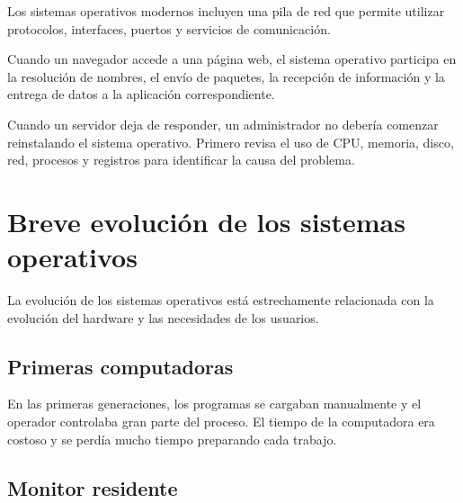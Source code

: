 \documentclass[
  spanish,
  letterpaper,
]{scrbook}
\begin{document}
Los sistemas operativos modernos incluyen una pila de red que permite
utilizar protocolos, interfaces, puertos y servicios de comunicación.

Cuando un navegador accede a una página web, el sistema operativo
participa en la resolución de nombres, el envío de paquetes, la
recepción de información y la entrega de datos a la aplicación
correspondiente.

\begin{tcolorbox}[enhanced jigsaw, arc=.35mm, bottomrule=.15mm, bottomtitle=1mm, breakable, colback=white, colbacktitle=quarto-callout-tip-color!10!white, colframe=quarto-callout-tip-color-frame, coltitle=black, left=2mm, leftrule=.75mm, opacityback=0, opacitybacktitle=0.6, rightrule=.15mm, title=\textcolor{quarto-callout-tip-color}{\faLightbulb}\hspace{0.5em}{En la práctica profesional}, titlerule=0mm, toprule=.15mm, toptitle=1mm]

Cuando un servidor deja de responder, un administrador no debería
comenzar reinstalando el sistema operativo. Primero revisa el uso de
CPU, memoria, disco, red, procesos y registros para identificar la causa
del problema.

\end{tcolorbox}


\chapter{Breve evolución de los sistemas
operativos}\label{breve-evoluciuxf3n-de-los-sistemas-operativos}

La evolución de los sistemas operativos está estrechamente relacionada
con la evolución del hardware y las necesidades de los usuarios.

\section{Primeras computadoras}\label{primeras-computadoras}

En las primeras generaciones, los programas se cargaban manualmente y el
operador controlaba gran parte del proceso. El tiempo de la computadora
era costoso y se perdía mucho tiempo preparando cada trabajo.

\section{Monitor residente}\label{monitor-residente}
\end{document}
